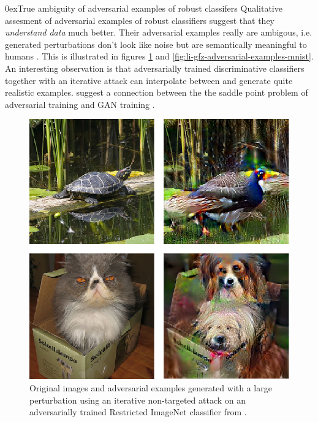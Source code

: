 \documentclass[conference,compsoc]{IEEEtran}
\makeatletter
\def\paragraph{\@startsection{paragraph}{4}{\z@}{1.5ex plus 1.5ex minus 0.5ex}%
{0ex}{\bfseries}}
\makeatother
\begin{document}
\paragraph{True ambiguity of adversarial examples of robust classifers}
Qualitative assesment of adversarial examples of robust classifiers suggest that they \textit{understand data} much better. Their adversarial examples really are ambigous, i.e. generated perturbations don't look like noise but are semantically meaningful to humans \citep{Tsipras:2018:RMBOA,Li:2019:AGCMRAA}.  This is illustrated in figures \ref{fig:tsipras-robust-adversarial-examples} and \ref{fig:li-gfz-adversarial-examples-mnist}. An interesting observation is that adversarially trained discriminative classifiers together with an iterative attack can interpolate between and generate quite realistic examples. \citet{Tsipras:2018:RMBOA} suggest a connection between the the saddle point problem of adversarial training and GAN training \citep{Goodfellow:2014:GAN}.

\begin{figure}[htbp!]
	\begin{center}
		\includegraphics[width=0.85\columnwidth]{figures/adversarial-examples/tsipras-turtle-bird-cat-dogs}
	\end{center}
	\caption{Original images and adversarial examples generated with a large perturbation using an iterative non-targeted attack on an adversarially trained Restricted ImageNet \citep{Tsipras:2018:RMBOA} classifier from \citet{Tsipras:2018:RMBOA}.}
	\label{fig:tsipras-robust-adversarial-examples}
\end{figure}
\end{document}
